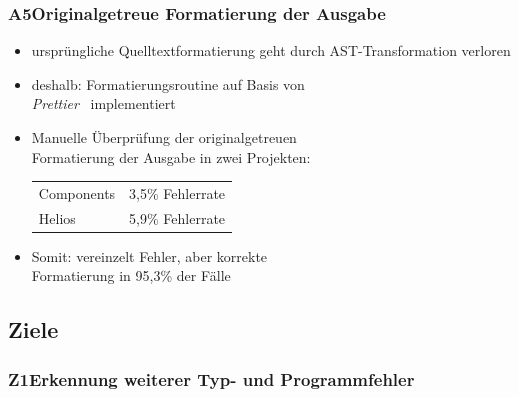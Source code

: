       \begin{frame}
        \frametitle{A5\hspace{0.75em}Originalgetreue Formatierung der Ausgabe}
        \begin{itemize}
          \item ursprüngliche Quelltextformatierung geht durch AST-Transformation verloren
          \item deshalb: Formatierungsroutine auf Basis von\\\textit{Prettier}~\autocite{SOFTWARE:PRETTIER} implementiert
          \item Manuelle Überprüfung der originalgetreuen\\Formatierung der Ausgabe in zwei Projekten:\\
            \medskip
            {
              \footnotesize
              \begin{tabu} to 
                Components & 3,5\% Fehlerrate \\
                Helios     & 5,9\% Fehlerrate \\
              \end{tabu}
            }
          \item Somit: vereinzelt Fehler, aber korrekte\\Formatierung in 95,3\% der Fälle
        \end{itemize}
      \end{frame}

    \subsection{Ziele}

      \begin{frame}
        \frametitle{Z1\hspace{0.75em}Erkennung weiterer Typ- und Programmfehler}
      \end{frame}

